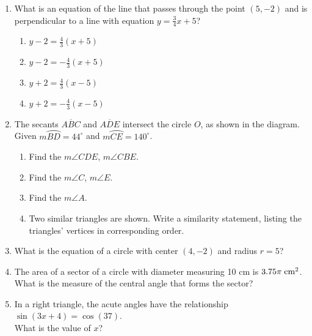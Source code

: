 \documentclass[12pt, oneside]{article}
\begin{document}
\begin{enumerate}[itemsep=1.2cm]
\item What is an equation of the line that passes through the point $(5,-2)$ and is perpendicular to a line with equation $y=\frac{3}{4}x+5$?
\begin{multicols}{2}
\begin{enumerate}
    \item $y-2=\frac{4}{3}(x+5)$
    \item $y-2=-\frac{4}{3}(x+5)$ 
    \item $y+2=\frac{4}{3}(x-5)$
    \item $y+2=-\frac{4}{3}(x-5)$
\end{enumerate}
\end{multicols}

\item The secants $\overline{ABC}$ and $\overline{ADE}$ intersect the circle $O$, as shown in the diagram. \\Given $m \wideparen{BD}=44^\circ$ and $m \wideparen{CE}=140^\circ$.
  \begin{enumerate}
    \item Find the $m\angle CDE$, $m\angle CBE$.
    \item Find the $m\angle C$, $m\angle E$.
    \item Find the $m\angle A$.
    \item Two similar triangles are shown. Write a similarity statement, listing the triangles' vertices in corresponding order.
  \end{enumerate}
  \begin{center}
  \end{center}

\item What is the equation of a circle with center $(4,-2)$ and radius $r=5$?


\item The area of a sector of a circle with diameter measuring 10 cm is $3.75\pi \; \rm{cm}^2$. What is the measure of the central angle that forms the sector?

\item In a right triangle, the acute angles have the relationship \\$\sin (3x + 4)=\cos (37)$.\\[0.25cm]
    What is the value of $x$?


\end{enumerate}
\end{document}
